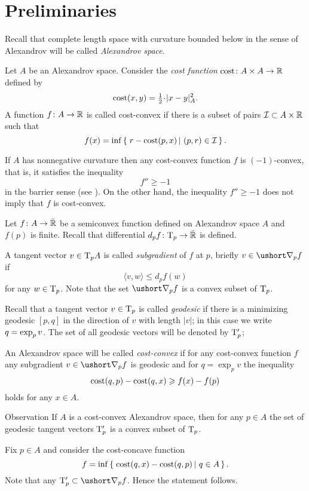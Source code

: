 \section{Preliminaries}

Recall that complete length space with curvature bounded below in the sense of Alexandrov will be called \emph{Alexandrov space}.

Let $A$ be an Alexandrov space.
Consider the \emph{cost function} $\text{\rm cost}\colon A\times A\to \mathbb{R}$ defined by \[\cost(x,y)=\tfrac12\cdot|x-y|_A^2.\]
A function $f\colon A\to \mathbb{R}$ is called cost-convex if there is a subset of pairs $\mathcal{I}\subset A\times \mathbb{R}$ such that
\[f(x)=\inf\set{r-\cost(p,x)}{(p,r)\in\mathcal{I}}.\]

If $A$ has nonnegative curvature then any cost-convex function $f$ is $(-1)$-convex, that is, it satisfies the inequality 
\[f''\ge -1\]
in the barrier sense (see \cite{AKP-book}).
On the other hand, the inequality $f''\ge -1$ does not imply that $f$ is cost-convex.


Let $f\colon A\to \bar{\mathbb{R}}$ be a semiconvex function defined on Alexandrov space $A$
and $f(p)$ is finite.
Recall that differential $d_pf\colon\mathrm{T}_p\to \bar{\mathbb{R}}$ is defined.

A tangent vector $v\in \mathrm{T}_pA$ is called \emph{subgradient} of $f$ at $p$, briefly $v\in\ushort\nabla_pf$ if
\[\langle v,w\rangle\le d_pf(w)\]
for any $w\in \mathrm{T}_p$.
Note that the set $\ushort\nabla_pf$ is a convex subset of $\mathrm{T}_p$.

Recall that a tangent vector $v\in\mathrm{T}_p$ is called \emph{geodesic} if there is a minimizing geodesic $[p,q]$ in the direction of $v$ with length $|v|$;
in this case we write $q\zz=\exp_pv$.
The set of all geodesic vectors will be denoted by $\mathrm{T}'_p$;

An Alexandrov space will be called \emph{cost-convex} if 
for any cost-convex function $f$ any subgradient $v\in\ushort\nabla_pf$ is geodesic 
and for $q=\exp_pv$ the inequality 
\[\text{\rm cost}(q,p)-\text{\rm cost}(q,x)\geqslant f(x)-f(p)\]
holds for any $x\in A$.

\begin{thm}{Observation}
If $A$ is a cost-convex Alexandrov space, then for any $p\in A$ the set of geodesic tangent vectors $\mathrm{T}'_p$ is a convex subset of $\mathrm{T}_p$. 
\end{thm}

Fix $p\in A$ and consider the cost-concave function 
\[f=\inf\set{\cost(q,x)-\cost(q,p)}{q\in A}.\]
Note that any $\T'_p\subset \ushort\nabla_pf$.
Hence the statement follows.
\qeds

